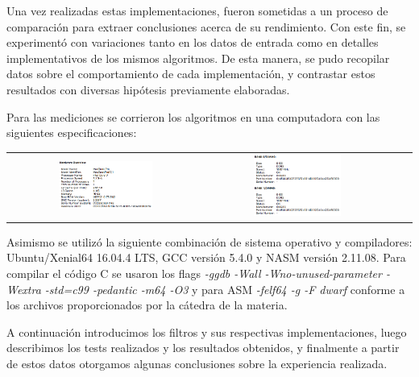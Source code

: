 Una vez realizadas estas implementaciones, fueron sometidas a un proceso de comparación para extraer conclusiones acerca de su rendimiento. Con este fin, se experimentó con variaciones tanto en los datos de entrada como en detalles implementativos de los mismos algoritmos. De esta manera, se pudo recopilar datos sobre el comportamiento de cada implementación, y contrastar estos resultados con diversas hipótesis previamente elaboradas.

Para las mediciones se corrieron los algoritmos en una computadora con las siguientes especificaciones:

\begin{center}
  \begin{tabular}{cccc}
    \includegraphics[width=0.5\textwidth]{imagenes/hardware.png} &
    \includegraphics[width=0.5\textwidth]{imagenes/memory.png} \\
  \end{tabular}
 \end{center}

 Asimismo se utilizó la siguiente combinación de sistema operativo y compiladores: Ubuntu/Xenial64 16.04.4 LTS, GCC versión 5.4.0 y NASM versión 2.11.08. Para compilar el código C se usaron los flags \textit{-ggdb -Wall -Wno-unused-parameter -Wextra -std=c99 -pedantic -m64 -O3} y para ASM \textit{-felf64 -g -F dwarf} conforme a los archivos proporcionados por la cátedra de la materia.


A continuación introducimos los filtros y sus respectivas implementaciones, luego describimos los tests realizados y los resultados obtenidos, y finalmente a partir de estos datos otorgamos algunas conclusiones sobre la experiencia realizada.